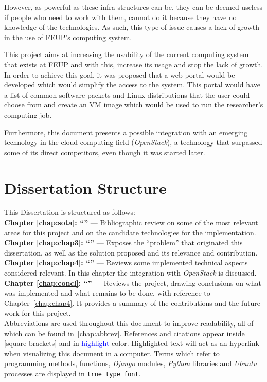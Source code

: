However, as powerful as these infra-structures can be, they can be deemed useless if people who need to work with them, cannot do it because they have no knowledge of the technologies. As such, this type of issue causes a lack of growth in the use of FEUP's computing system.

This project aims at increasing the usability of the current computing system that exists at FEUP and with this, increase its usage and stop the lack of growth. In order to achieve this goal, it was proposed that a web portal would be developed which would simplify the access to the system. This portal would have a list of common software packets and Linux distributions that the user could choose from and create an VM image which would be used to run the researcher's computing job.

Furthermore, this document presents a possible integration with an emerging technology in the cloud computing field (\textit{OpenStack}), a technology that surpassed some of its direct competitors, even though it was started later.

\section{Dissertation Structure} \label{sec:structure}

This Dissertation is structured as follows:\\
\textbf{Chapter \ref{chap:sota}: ``'' } --- Bibliographic review on some of the most relevant areas for this project and on the candidate technologies for the implementation.\\
\textbf{Chapter \ref{chap:chap3}: ``'' } --- Exposes the ``problem'' that originated this dissertation, as well as the solution proposed and its relevance and contribution.\\
\textbf{Chapter \ref{chap:chap4}: ``'' } --- Reviews some implemented technical aspects considered relevant. In this chapter the integration with \textit{OpenStack} is discussed. \\
\textbf{Chapter \ref{chap:concl}: ``'' } --- Reviews the project, drawing conclusions on what was implemented and what remains to be done, with reference to Chapter~\ref{chap:chap4}. It provides a summary of the contributions and the future work for this project.\\

Abbreviations are used throughout this document to improve readability, all of which can be found in~\ref{chap:abbrev}. References and citations appear inside [square brackets] and in \textcolor{blue}{highlight} color. Highlighted text will act as an hyperlink when visualizing this document in a computer. Terms which refer to programming methods, functions, \textit{Django} modules, \textit{Python} libraries and \textit{Ubuntu} processes are displayed in \texttt{true type font}.
